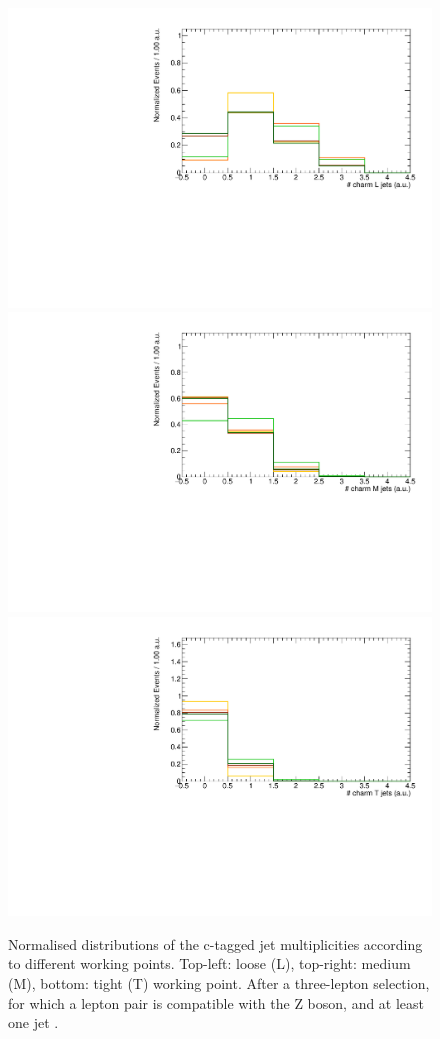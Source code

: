 \begin{figure}[htbp]
	\centering
	\includegraphics[width=0.49\linewidth]{7_Conclusion/Figures/charmtagging/3lepcontrol_dilep_nJetsCharmL_all_Normalized}
	\includegraphics[width=0.49\linewidth]{7_Conclusion/Figures/charmtagging/3lepcontrol_dilep_nJetsCharmM_all_Normalized}
	\includegraphics[width=0.49\linewidth]{7_Conclusion/Figures/charmtagging/3lepcontrol_dilep_nJetsCharmT_all_Normalized}
	\caption{Normalised distributions of the c-tagged jet multiplicities according to different working points. Top-left: loose (L), top-right: medium (M), bottom:  tight (T) working point. After a three-lepton selection, for which a lepton pair is compatible with the Z boson, and at least one jet .}
	\label{fig:charm}
\end{figure}

